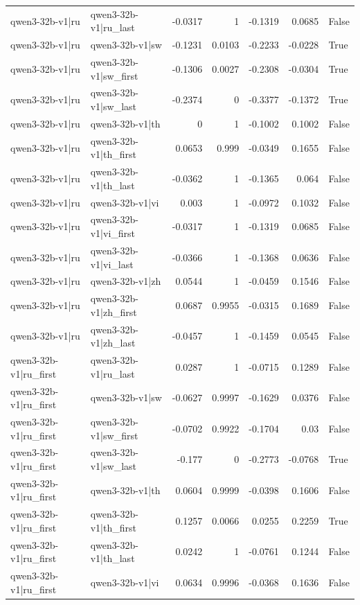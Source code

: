 \begin{table}
\begin{tabular}{l l r r r r l}
qwen3-32b-v1|ru & qwen3-32b-v1|ru_last & -0.0317 & 1 & -0.1319 & 0.0685 & False \\
qwen3-32b-v1|ru & qwen3-32b-v1|sw & -0.1231 & 0.0103 & -0.2233 & -0.0228 & True \\
qwen3-32b-v1|ru & qwen3-32b-v1|sw_first & -0.1306 & 0.0027 & -0.2308 & -0.0304 & True \\
qwen3-32b-v1|ru & qwen3-32b-v1|sw_last & -0.2374 & 0 & -0.3377 & -0.1372 & True \\
qwen3-32b-v1|ru & qwen3-32b-v1|th & 0 & 1 & -0.1002 & 0.1002 & False \\
qwen3-32b-v1|ru & qwen3-32b-v1|th_first & 0.0653 & 0.999 & -0.0349 & 0.1655 & False \\
qwen3-32b-v1|ru & qwen3-32b-v1|th_last & -0.0362 & 1 & -0.1365 & 0.064 & False \\
qwen3-32b-v1|ru & qwen3-32b-v1|vi & 0.003 & 1 & -0.0972 & 0.1032 & False \\
qwen3-32b-v1|ru & qwen3-32b-v1|vi_first & -0.0317 & 1 & -0.1319 & 0.0685 & False \\
qwen3-32b-v1|ru & qwen3-32b-v1|vi_last & -0.0366 & 1 & -0.1368 & 0.0636 & False \\
qwen3-32b-v1|ru & qwen3-32b-v1|zh & 0.0544 & 1 & -0.0459 & 0.1546 & False \\
qwen3-32b-v1|ru & qwen3-32b-v1|zh_first & 0.0687 & 0.9955 & -0.0315 & 0.1689 & False \\
qwen3-32b-v1|ru & qwen3-32b-v1|zh_last & -0.0457 & 1 & -0.1459 & 0.0545 & False \\
qwen3-32b-v1|ru_first & qwen3-32b-v1|ru_last & 0.0287 & 1 & -0.0715 & 0.1289 & False \\
qwen3-32b-v1|ru_first & qwen3-32b-v1|sw & -0.0627 & 0.9997 & -0.1629 & 0.0376 & False \\
qwen3-32b-v1|ru_first & qwen3-32b-v1|sw_first & -0.0702 & 0.9922 & -0.1704 & 0.03 & False \\
qwen3-32b-v1|ru_first & qwen3-32b-v1|sw_last & -0.177 & 0 & -0.2773 & -0.0768 & True \\
qwen3-32b-v1|ru_first & qwen3-32b-v1|th & 0.0604 & 0.9999 & -0.0398 & 0.1606 & False \\
qwen3-32b-v1|ru_first & qwen3-32b-v1|th_first & 0.1257 & 0.0066 & 0.0255 & 0.2259 & True \\
qwen3-32b-v1|ru_first & qwen3-32b-v1|th_last & 0.0242 & 1 & -0.0761 & 0.1244 & False \\
qwen3-32b-v1|ru_first & qwen3-32b-v1|vi & 0.0634 & 0.9996 & -0.0368 & 0.1636 & False \\

\end{tabular}
\end{table}
